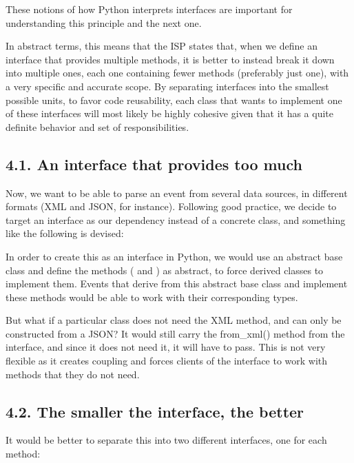 \documentclass[a4paper,10pt,english]{sphinxmanual}
\begin{document}
These notions of how Python interprets interfaces are important for understanding this
principle and the next one.

In abstract terms, this means that the ISP states that, when we define an interface that
provides multiple methods, it is better to instead break it down into multiple ones, each one
containing fewer methods (preferably just one), with a very specific and accurate scope. By
separating interfaces into the smallest possible units, to favor code reusability, each class
that wants to implement one of these interfaces will most likely be highly cohesive given
that it has a quite definite behavior and set of responsibilities.


\subsection{4.1. An interface that provides too much}
\label{\detokenize{chapters/4_solid_principles/index:an-interface-that-provides-too-much}}
Now, we want to be able to parse an event from several data sources, in different formats
(XML and JSON, for instance). Following good practice, we decide to target an interface as
our dependency instead of a concrete class, and something like the following is devised:

\begin{figure}[H]
\centering

\noindent{}
\end{figure}

In order to create this as an interface in Python, we would use an abstract base class and
define the methods ( and ) as abstract, to force derived classes to
implement them. Events that derive from this abstract base class and implement these
methods would be able to work with their corresponding types.

But what if a particular class does not need the XML method, and can only be constructed
from a JSON? It would still carry the from\_xml() method from the interface, and since it
does not need it, it will have to pass. This is not very flexible as it creates coupling and
forces clients of the interface to work with methods that they do not need.


\subsection{4.2. The smaller the interface, the better}
\label{\detokenize{chapters/4_solid_principles/index:the-smaller-the-interface-the-better}}
It would be better to separate this into two different interfaces, one for each method:
\end{document}
